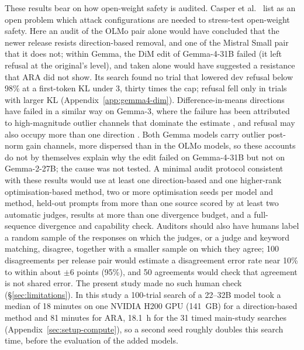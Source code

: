 These results bear on how open-weight safety is audited. Casper et
al.~\cite{casper2026open} list as an open problem which attack configurations
are needed to stress-test open-weight safety. Here an audit of the OLMo pair
alone would have concluded that the newer release resists direction-based
removal, and one of the Mistral Small pair that it does not; within Gemma, the
DiM edit of Gemma-4-31B failed (it left refusal at the original's level), and
taken alone would have suggested a resistance that ARA did not show. Its
search found no trial that lowered dev refusal below 98\% at a first-token KL
under 3, thirty times the cap; refusal fell only in trials with larger KL
(Appendix~\ref{app:gemma4-dim}). Difference-in-means directions have failed in
a similar way on Gemma-3, where the failure has been attributed to
high-magnitude outlier channels that dominate the estimate
\cite{lai2025mpoa,mishra2026onecoordinate}, and refusal may also occupy more
than one direction \cite{wollschlager2025geometry}. Both Gemma models carry
outlier post-norm gain channels, more dispersed than in the OLMo models, so
these accounts do not by themselves explain why the edit failed on Gemma-4-31B but
not on Gemma-2-27B; the cause was not tested.
 A minimal audit protocol consistent with
these results would use at least one direction-based and one higher-rank
optimisation-based method, two or more optimisation seeds per model and
method, held-out prompts from more than one source scored by at least two
automatic judges, results at more than one divergence budget, and a
full-sequence divergence and capability check. Auditors should also have
humans label a random sample of the responses on which the judges, or a judge
and keyword matching, disagree, together with a smaller sample on which they
agree; 100 disagreements per release pair would estimate a disagreement error
rate near 10\% to within about $\pm$6 points (95\%), and 50 agreements would
check that agreement is not shared error. The present study made no such human
check (\S\ref{sec:limitations}). In this study a 100-trial search of a
22--32B model took a median of 18 minutes on one NVIDIA H200 GPU (141~GB) for a
direction-based method and 81 minutes for ARA, 18.1~h for the 31 timed
main-study searches (Appendix~\ref{sec:setup-compute}), so a second seed
roughly doubles this search time, before the evaluation of the added models.
